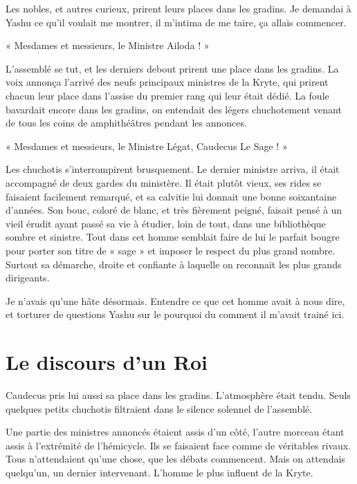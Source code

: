 \documentclass{book}
\begin{document}
Les nobles, et autres curieux, prirent leurs places dans les gradins. Je demandai à Yashu ce qu'il voulait me montrer, il m'intima de me taire, ça allais commencer.\newline

« Mesdames et messieurs, le Ministre Ailoda ! »\newline

L'assemblé se tut, et les derniers debout prirent une place dans les gradins. La voix annonça l'arrivé des neufs principaux ministres de la Kryte, qui prirent chacun leur place dans l'assise du premier rang qui leur était dédié. La foule bavardait encore dans les gradins, on entendait des légers chuchotement venant de tous les coins de amphithéâtres pendant les annonces.\newline

« Mesdames et messieurs, le Ministre Légat, Caudecus Le Sage ! »\newline

Les chuchotis s'interrompirent brusquement. Le dernier ministre arriva, il était accompagné de deux gardes du ministère. Il était plutôt vieux, ses rides se faisaient facilement remarqué, et sa calvitie lui donnait une bonne soixantaine d'années. Son bouc, coloré de blanc, et très fièrement peigné, faisait pensé à un vieil érudit ayant passé sa vie à étudier, loin de tout, dans une bibliothèque sombre et sinistre. Tout dans cet homme semblait faire de lui le parfait bougre pour porter son titre de « sage » et imposer le respect du plus grand nombre. Surtout sa démarche, droite et confiante à laquelle on reconnait les plus grands dirigeants.\newline

Je n'avais qu'une hâte désormais. Entendre ce que cet homme avait à nous dire, et torturer de questions Yashu sur le pourquoi du comment il m'avait trainé ici.

\chapter{Le discours d'un Roi}
Caudecus pris lui aussi sa place dans les gradins. L'atmosphère était tendu. Seuls quelques petits chuchotis filtraient dans le silence solennel de l'assemblé.\newline

Une partie des ministres annoncés étaient assis d'un côté, l'autre morceau étant assis à l'extrémité de l'hémicycle. Ils se faisaient face comme de véritables rivaux. Tous n'attendaient qu'une chose, que les débats commencent. Mais on attendais quelqu'un, un dernier intervenant. L'homme le plus influent de la Kryte.\newline
\end{document}

